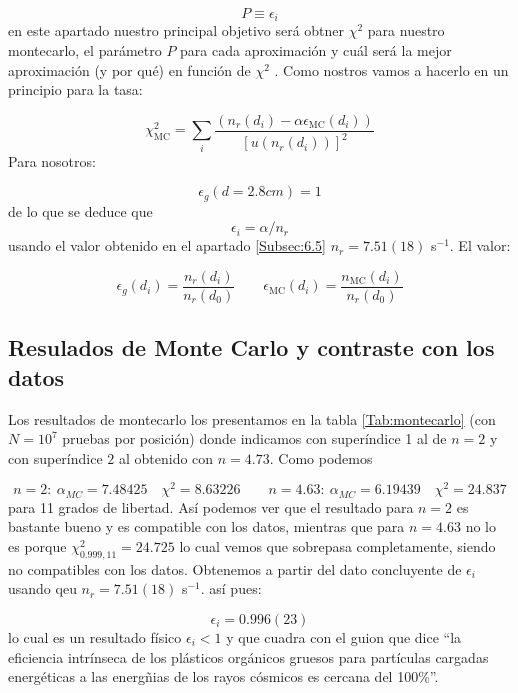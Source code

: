 \documentclass[11pt]{article}
\newcommand{\parentesis}[1]{\left( #1  \right)}
\newcommand{\ccorchetes}[1]{\left[ #1  \right]}
\begin{document}
\begin{equation}
	P \equiv \epsilon_i
\end{equation}
en este apartado nuestro principal objetivo será obtner $\chi^2$ para nuestro montecarlo, el parámetro $P$ para cada aproximación y cuál será la mejor aproximación (y por qué) en función de $\chi^2$ \cite{N6}. Como nostros vamos a hacerlo en un principio para la tasa: 

\begin{equation}
	\chi^2_{\text{MC}} = \sum_i \frac{\parentesis{n_r(d_i)- \alpha \epsilon_{\text{MC}} (d_i)}}{\ccorchetes{u(n_r(d_i))}^2}
\end{equation}
Para nosotros:

\begin{equation}
	\epsilon_g(d=2.8 \unit{cm}) = 1
\end{equation}
de lo que se deduce que
\begin{equation}
	\epsilon_i = \alpha / n_r
\end{equation}
usando el valor obtenido en el apartado \ref{Subsec:6.5} $n_r=7.51(18)$ s$^{-1}$. El valor: 

\begin{equation}
	\epsilon_g(d_i) = \frac{n_r(d_i)}{n_r(d_0)}  \qquad 
	\epsilon_{\text{MC}}(d_i) = \frac{n_\text{MC}(d_i)}{n_r(d_0)}
\end{equation}
\subsection{Resulados de Monte Carlo y contraste con los datos}

Los resultados de montecarlo los presentamos en la tabla \cref{Tab:montecarlo} (con $N=10^7$ pruebas por posición) donde indicamos con superíndice 1 al de $n=2$ y con superíndice $2$ al obtenido con $n=4.73$. Como podemos 

\begin{equation}
n = 2: \  \alpha_{MC} =  7.48425 \quad \chi^2 =8.63226 \qquad 
n = 4.63 : \  \alpha_{MC} = 6.19439 \quad \chi^2 = 24.837
\end{equation}
para 11 grados de libertad. Así podemos ver que el resultado para $n=2$ es bastante bueno y es compatible con los datos, mientras que para $n=4.63$ no lo es porque $\chi^2_{0.999,11}= 24.725$ lo cual vemos que sobrepasa completamente, siendo no compatibles con los datos. Obtenemos a partir del dato concluyente de $\epsilon_i$ usando qeu $n_r=7.51(18)$ s$^{-1}$. así pues: 

\begin{equation}
	\epsilon_i = 0.996(23)
\end{equation}
lo cual es un resultado físico $\epsilon_i<1$ y que cuadra con el guion \cite{P2} que dice ``la eficiencia intrínseca de los plásticos orgánicos gruesos para partículas cargadas energéticas a las energñias de los rayos cósmicos es cercana del 100\%''.
\end{document}

